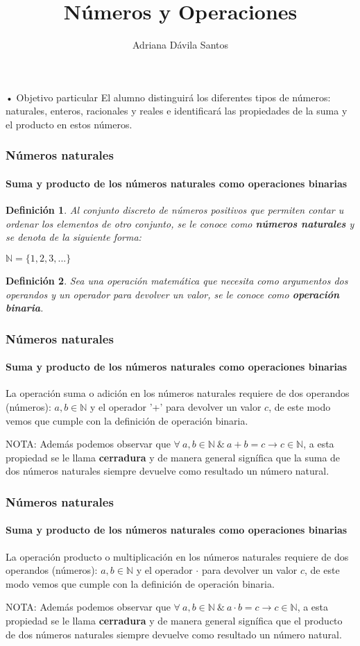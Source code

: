 \documentclass[11pt]{beamer}
\author{Adriana Dávila Santos}
\title{Números y Operaciones}
\newtheorem{defi}{Definición}
\begin{document}
\begin{frame}
\titlepage
\end{frame}


\begin{frame}{• Objetivo particular}
El alumno distinguirá los diferentes tipos de números: naturales, enteros, racionales y reales e
identificará las propiedades de la suma y el producto en estos números.
\end{frame}
\begin{frame}
\frametitle{Números naturales}
\framesubtitle{Suma y producto de los números naturales como operaciones binarias}
\begin{defi}
Al conjunto discreto de números positivos que permiten contar u ordenar los elementos
de otro conjunto, se le conoce como \textbf{números naturales} y se denota de la siguiente forma:\\
\begin{center}
$\mathbb{N} = \{1,2,3,...\}$
\end{center}
\end{defi}
\begin{defi}
Sea una operación matemática que necesita como argumentos dos operandos y un operador para
devolver un valor, se le conoce como \textbf{operación binaria}.
\end{defi}
\end{frame}

\begin{frame}
\frametitle{Números naturales}
\framesubtitle{Suma y producto de los números naturales como operaciones binarias}
La operación suma o adición en los números naturales requiere de dos operandos (números):
$a,b \in \mathbb{N}$ y el operador '+' para devolver un valor $c$, de este modo
vemos que cumple con la definición de operación binaria.\hspace{2cm}

NOTA: Además podemos observar que $\forall ~ a,b \in \mathbb{N} ~ \& ~ a + b = c \rightarrow c\in \mathbb{N}$,
a esta propiedad se le llama \textbf{cerradura} y de manera general signífica que la suma de dos 
números naturales siempre devuelve como resultado un número natural.
\end{frame}

\begin{frame}
\frametitle{Números naturales}
\framesubtitle{Suma y producto de los números naturales como operaciones binarias}
La operación producto o multiplicación en los números naturales requiere de dos operandos (números):
$a,b \in \mathbb{N}$ y el operador $\cdot$ para devolver un valor $c$, de este modo
vemos que cumple con la definición de operación binaria.\\ \hspace{2cm}

NOTA: Además podemos observar que $\forall ~ a,b \in \mathbb{N} ~ \& ~ a \cdot b = c \rightarrow c\in \mathbb{N}$,
a esta propiedad se le llama \textbf{cerradura} y de manera general signífica que el producto de dos 
números naturales siempre devuelve como resultado un número natural.
\end{frame}
\end{document}
